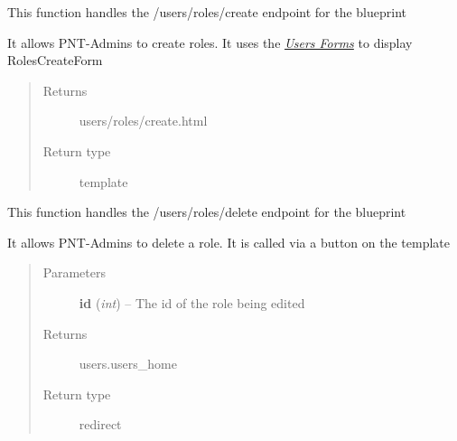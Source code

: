 \documentclass[letterpaper,10pt,english]{sphinxmanual}
\begin{document}
\begin{fulllineitems}
\label{dev-users:cagenix.users.views.roles_create}
This function handles the /users/roles/create endpoint for the blueprint

It allows PNT-Admins to create roles.  It uses the {\hyperref[dev-users:users-forms-label]{\emph{Users Forms}}}
to display RolesCreateForm
\begin{quote}\begin{description}
\item[{Returns}] \leavevmode
users/roles/create.html

\item[{Return type}] \leavevmode
template

\end{description}\end{quote}

\end{fulllineitems}


\begin{fulllineitems}
\label{dev-users:cagenix.users.views.roles_delete}
This function handles the /users/roles/delete endpoint for the blueprint

It allows PNT-Admins to delete a role.  It is called via a button on the
 template
\begin{quote}\begin{description}
\item[{Parameters}] \leavevmode
\textbf{id} (\emph{int}) -- The id of the role being edited

\item[{Returns}] \leavevmode
users.users\_home

\item[{Return type}] \leavevmode
redirect

\end{description}\end{quote}

\end{fulllineitems}

\end{document}
